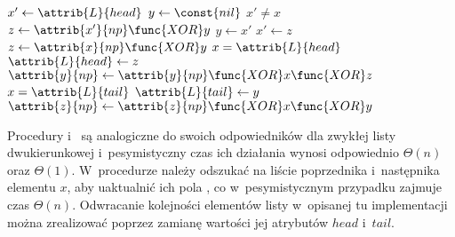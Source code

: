 \begin{codebox}
\li	$x'\gets\attrib{L}{head}$
\li	$y\gets\const{nil}$
\li	\While $x'\ne x$
\li		\Do $z\gets\attrib{x'}{np}\func{XOR}y$
\li			$y\gets x'$
\li			$x'\gets z$
		\End
\li	$z\gets\attrib{x}{np}\func{XOR}y$
\li	\If $x=\attrib{L}{head}$
\li		\Then $\attrib{L}{head}\gets z$
\li		\Else $\attrib{y}{np}\gets\attrib{y}{np}\func{XOR}x\func{XOR}z$
		\End
\li	\If $x=\attrib{L}{tail}$
\li		\Then $\attrib{L}{tail}\gets y$
\li		\Else $\attrib{z}{np}\gets\attrib{z}{np}\func{XOR}x\func{XOR}y$
		\End
\end{codebox}

Procedury  i~ są analogiczne do swoich odpowiedników dla zwykłej listy dwukierunkowej i~pesymistyczny czas ich działania wynosi odpowiednio $\Theta(n)$ oraz $\Theta(1)$.
W~procedurze  należy odszukać na liście poprzednika i~następnika elementu $x$, aby uaktualnić ich pola , co w~pesymistycznym przypadku zajmuje czas $\Theta(n)$.
Odwracanie kolejności elementów listy w~opisanej tu implementacji można zrealizować poprzez zamianę wartości jej atrybutów $head$ i~$tail$.
